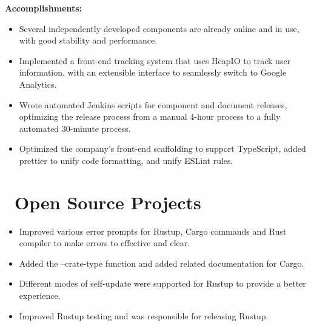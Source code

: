 \documentclass{resume}
\newcommand{\en}[1]{#1}
\newcommand{\zh}[1]{}
\begin{document}
\en{\textbf{Accomplishments:}}
\zh{\textbf{产出：}}
\begin{itemize}
      \item \en{Several independently developed components are already online and in use, with good stability and performance.}
            \zh{多个独立开发的组件已经上线使用，有较好的稳定性和性能。}
      \item \en{Implemented a front-end tracking system that uses HeapIO to track user information, with an extensible interface to seamlessly switch to Google Analytics.}
            \zh{实现了前端的 tracking 系统，使用 HeapIO 追踪用户信息，并预留可扩展接口，可无缝切换至 Google Analytics。}
      \item \en{Wrote automated Jenkins scripts for component and document releases, optimizing the release process from a manual 4-hour process to a fully automated 30-minute process.}
            \zh{为组件和文档发布编写了自动化 Jenkins 脚本，将发布流程从手动 4 小时优化到全自动 30 分钟。}
      \item \en{Optimized the company's front-end scaffolding to support TypeScript, added prettier to unify code formatting, and unify ESLint rules.}
            \zh{优化公司前端脚手架，使其支持 TypeScript，添加 prettier 统一代码格式，优化统一 ESLint 规则。}
\end{itemize}

\section{\faGithubAlt\ \en{Open Source Projects}\zh{开源项目}}
\en{}
\zh{\role{活跃维护者}{\href{https://github.com/search?q=repo:rust-lang/cargo+repo:rust-lang/rustup+repo:rust-lang/rust+author:hi-rustin&type=commits}{380+ 个提交}}}
\begin{itemize}
      \item \en{Improved various error prompts for Rustup, Cargo commands and Rust compiler to make errors to effective and clear.}
            \zh{改善了大量 Rustup、Cargo 命令和 Rust 编译器的错误提示，让错误更有效更清晰。}
      \item \en{Added the --crate-type function and added related documentation for Cargo.}
            \zh{为 Cargo 添加了 --crate-type 功能和相关文档。}
      \item \en{Different modes of self-update were supported for Rustup to provide a better experience.}
            \zh{为 Rustup 支持了 self-update 的不同模式来提供更好的使用体验。}
      \item \en{Improved Rustup testing and was responsible for releasing Rustup.}
            \zh{改善 Rustup 测试，负责发布 Rustup。}
\end{itemize}
\end{document}
